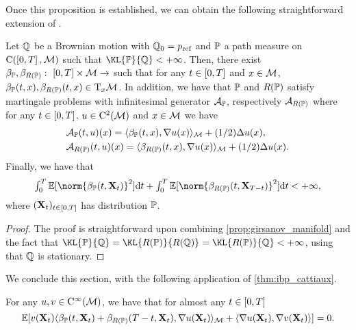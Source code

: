   Once this proposition is established, we can obtain the following
  straightforward extension of \citet[Proposition 4.6]{cattiaux2021time}.

  \begin{proposition}
    \label{prop:hyp_317}
    Let $\mathbb{Q}$ be a Brownian motion with $\mathbb{Q}_0 = p_{\textup{ref}}$ and $\mathbb{P}$ a path
    measure on $\mathrm{C}(\left[0,T\right], \mathcal M)$ such that $\KL{\Pbb}{\Qbb} <
    +\infty$. Then, there exist $\beta_{\mathbb{P}}, \beta_{R(\mathbb{P})}: \ \left[0,T\right] \times \mathcal M \to $
    such that for any $t \in \left[0,T\right]$ and $x \in \mathcal M$,
    $\beta_{\mathbb{P}}(t,x), \beta_{R(\mathbb{P})}(t,x) \in \mathrm{T}_x \mathcal M$. In addition, we have that
    $\mathbb{P}$ and $R(\mathbb{P})$ satisfy martingale problems with infinitesimal generator
    $\mathcal{A}_{\mathbb{P}}$, respectively $\mathcal{A}_{R(\mathbb{P})}$ where for any $t \in \left[0,T\right]$, $u \in \mathrm{C}^2(\mathcal M)$ and
    $x \in \mathcal M$ we have
    \begin{align}
      &\mathcal{A}_{\mathbb{P}}(t,u)(x) = \langle \beta_{\mathbb{P}}(t,x), \nabla u(x) \rangle_\mathcal M + (1/2) \Delta u(x)  , \\
      &\mathcal{A}_{R(\mathbb{P})}(t,u)(x) = \langle \beta_{R(\mathbb{P})}(t,x), \nabla u(x) \rangle_\mathcal M + (1/2) \Delta u(x)  . 
    \end{align}
    Finally, we have that
    \begin{equation}
      \textstyle{
        \int_0^T \expeLigne{\norm{\beta_\Pbb(t, \bfX_t)}^2} \rmd t + \int_0^T \expeLigne{\norm{\beta_{R(\Pbb)}(t, \bfX_{T-t})}^2} \rmd t < +\infty  ,
        }
    \end{equation}
    where $(\mathbf{X}_t)_{t \in \left[0,T\right]}$ has distribution $\mathbb{P}$.
  \end{proposition}

  \begin{proof}
    The proof is straightforward upon combining \cref{prop:girsanov_manifold}
    and the fact that
    $\KL{\Pbb}{\Qbb} = \KL{R(\Pbb)}{R(\Qbb)} = \KL{R(\Pbb)}{\Qbb} < +\infty$,
    using that $\mathbb{Q}$ is stationary.
  \end{proof}

  We conclude this section, with the following application of \cref{thm:ibp_cattiaux}.

  \begin{proposition}
    \label{prop:cattiaux_spec}
    For any $u, v \in \mathrm{C}^\infty(\mathcal M)$, we have that for almost any $t \in \left[0,T\right]$
    \begin{equation}
      \label{eq:equalitu}
      \mathbb{E} [ v(\mathbf{X}_t) \langle \beta_{\mathbb{P}}(t, \mathbf{X}_t) + \beta_{R(\mathbb{P})}(T-t, \mathbf{X}_t), \nabla u(\mathbf{X}_t) \rangle_\mathcal M + \langle \nabla u(\mathbf{X}_t), \nabla v(\mathbf{X}_t) \rangle ] = 0  . 
    \end{equation}
  \end{proposition}

